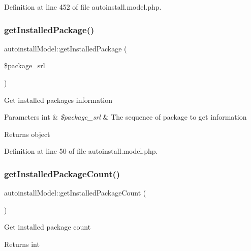 Definition at line 452 of file autoinstall.\+model.\+php.

\hypertarget{classautoinstallModel_a80912c7d12ec4d37f75d0e1475adab4e}{}\label{classautoinstallModel_a80912c7d12ec4d37f75d0e1475adab4e} 
\subsubsection{\texorpdfstring{get\+Installed\+Package()}{getInstalledPackage()}}
{\footnotesize\ttfamily autoinstall\+Model\+::get\+Installed\+Package (\begin{DoxyParamCaption}\item[{}]{\$package\+\_\+srl }\end{DoxyParamCaption})}

Get installed packages information


\begin{DoxyParams}[1]{Parameters}
int & {\em \$package\+\_\+srl} & The sequence of package to get information \\
\hline
\end{DoxyParams}
\begin{DoxyReturn}{Returns}
object 
\end{DoxyReturn}


Definition at line 50 of file autoinstall.\+model.\+php.

\hypertarget{classautoinstallModel_a1b9cec687d137129acec8db89f8a822b}{}\label{classautoinstallModel_a1b9cec687d137129acec8db89f8a822b} 
\subsubsection{\texorpdfstring{get\+Installed\+Package\+Count()}{getInstalledPackageCount()}}
{\footnotesize\ttfamily autoinstall\+Model\+::get\+Installed\+Package\+Count (\begin{DoxyParamCaption}{ }\end{DoxyParamCaption})}

Get installed package count

\begin{DoxyReturn}{Returns}
int 
\end{DoxyReturn}



